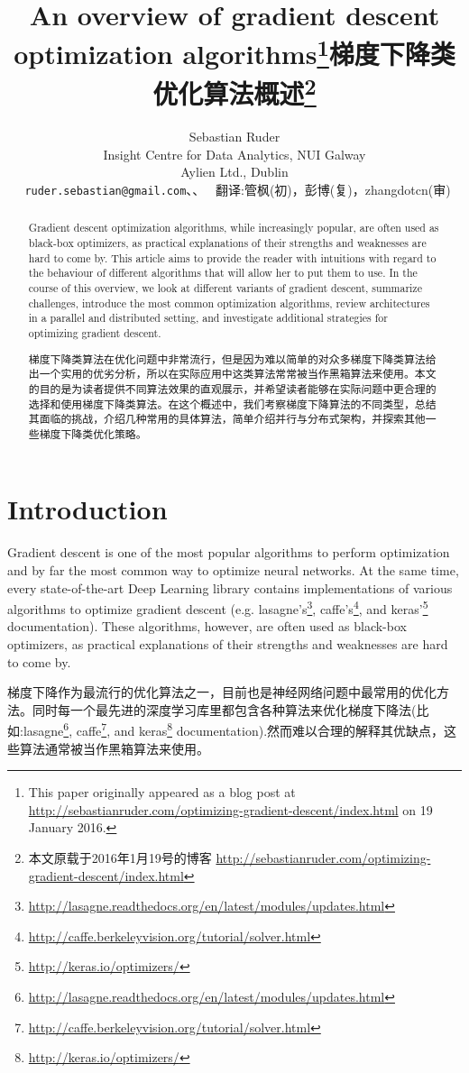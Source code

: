 \documentclass{article}
\title{An overview of gradient descent optimization algorithms\thanks{This paper originally appeared as a blog post at \url{http://sebastianruder.com/optimizing-gradient-descent/index.html} on 19 January 2016.}}
\title{梯度下降类优化算法概述\thanks{本文原载于2016年1月19号的博客 \url{http://sebastianruder.com/optimizing-gradient-descent/index.html}}}
\author{
  Sebastian Ruder\\
  Insight Centre for Data Analytics, NUI Galway\\
  Aylien Ltd., Dublin\\
  \texttt{ruder.sebastian@gmail.com}、、
  翻译:管枫(初)，彭博(复)，zhangdotcn(审)
}
\begin{document}
\maketitle

\begin{abstract}
Gradient descent optimization algorithms, while increasingly popular, are often used as black-box optimizers, as practical explanations of their strengths and weaknesses are hard to come by. This article aims to provide the reader with intuitions with regard to the behaviour of different algorithms that will allow her to put them to use. In the course of this overview, we look at different variants of gradient descent, summarize challenges, introduce the most common optimization algorithms, review architectures in a parallel and distributed setting, and investigate additional strategies for optimizing gradient descent.

梯度下降类算法在优化问题中非常流行，但是因为难以简单的对众多梯度下降类算法给出一个实用的优劣分析，所以在实际应用中这类算法常常被当作黑箱算法来使用。本文的目的是为读者提供不同算法效果的直观展示，并希望读者能够在实际问题中更合理的选择和使用梯度下降类算法。在这个概述中，我们考察梯度下降算法的不同类型，总结其面临的挑战，介绍几种常用的具体算法，简单介绍并行与分布式架构，并探索其他一些梯度下降类优化策略。
\end{abstract}

\section{Introduction}

Gradient descent is one of the most popular algorithms to perform optimization and by far the most common way to optimize neural networks. At the same time, every state-of-the-art Deep Learning library contains implementations of various algorithms to optimize gradient descent (e.g. lasagne's\footnote{\url{http://lasagne.readthedocs.org/en/latest/modules/updates.html}}, caffe's\footnote{\url{http://caffe.berkeleyvision.org/tutorial/solver.html}}, and keras'\footnote{\url{http://keras.io/optimizers/}} documentation). These algorithms, however, are often used as black-box optimizers, as practical explanations of their strengths and weaknesses are hard to come by.

梯度下降作为最流行的优化算法之一，目前也是神经网络问题中最常用的优化方法。同时每一个最先进的深度学习库里都包含各种算法来优化梯度下降法(比如:lasagne\footnote{\url{http://lasagne.readthedocs.org/en/latest/modules/updates.html}}, caffe\footnote{\url{http://caffe.berkeleyvision.org/tutorial/solver.html}}, and keras\footnote{\url{http://keras.io/optimizers/}} documentation).然而难以合理的解释其优缺点，这些算法通常被当作黑箱算法来使用。
\end{document}
